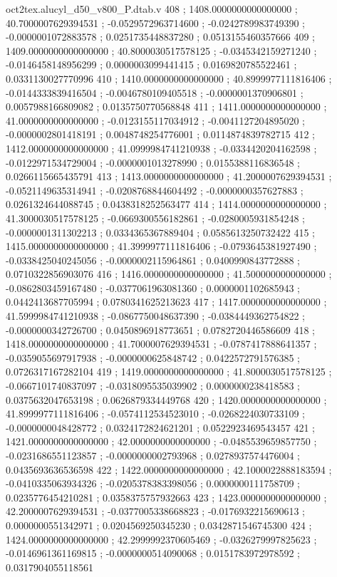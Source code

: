\begin{filecontents}[overwrite]{oct2tex.alucyl_d50_v800_P.dtab.v}
408 ; 1408.0000000000000000 ; 40.7000007629394531 ; -0.0529572963714600 ; -0.0242789983749390 ; -0.0000001072883578 ; 0.0251735448837280 ; 0.0513155460357666
409 ; 1409.0000000000000000 ; 40.8000030517578125 ; -0.0345342159271240 ; -0.0146458148956299 ; 0.0000003099441415 ; 0.0169820785522461 ; 0.0331130027770996
410 ; 1410.0000000000000000 ; 40.8999977111816406 ; -0.0144333839416504 ; -0.0046780109405518 ; -0.0000001370906801 ; 0.0057988166809082 ; 0.0135750770568848
411 ; 1411.0000000000000000 ; 41.0000000000000000 ; -0.0123155117034912 ; -0.0041127204895020 ; -0.0000002801418191 ; 0.0048748254776001 ; 0.0114874839782715
412 ; 1412.0000000000000000 ; 41.0999984741210938 ; -0.0334420204162598 ; -0.0122971534729004 ; -0.0000001013278990 ; 0.0155388116836548 ; 0.0266115665435791
413 ; 1413.0000000000000000 ; 41.2000007629394531 ; -0.0521149635314941 ; -0.0208768844604492 ; -0.0000000357627883 ; 0.0261324644088745 ; 0.0438318252563477
414 ; 1414.0000000000000000 ; 41.3000030517578125 ; -0.0669300556182861 ; -0.0280005931854248 ; -0.0000001311302213 ; 0.0334365367889404 ; 0.0585613250732422
415 ; 1415.0000000000000000 ; 41.3999977111816406 ; -0.0793645381927490 ; -0.0338425040245056 ; -0.0000002115964861 ; 0.0400990843772888 ; 0.0710322856903076
416 ; 1416.0000000000000000 ; 41.5000000000000000 ; -0.0862803459167480 ; -0.0377061963081360 ; 0.0000001102685943 ; 0.0442413687705994 ; 0.0780341625213623
417 ; 1417.0000000000000000 ; 41.5999984741210938 ; -0.0867750048637390 ; -0.0384449362754822 ; -0.0000000342726700 ; 0.0450896918773651 ; 0.0782720446586609
418 ; 1418.0000000000000000 ; 41.7000007629394531 ; -0.0787417888641357 ; -0.0359055697917938 ; -0.0000000625848742 ; 0.0422572791576385 ; 0.0726317167282104
419 ; 1419.0000000000000000 ; 41.8000030517578125 ; -0.0667101740837097 ; -0.0318095535039902 ; 0.0000000238418583 ; 0.0375632047653198 ; 0.0626879334449768
420 ; 1420.0000000000000000 ; 41.8999977111816406 ; -0.0574112534523010 ; -0.0268224030733109 ; -0.0000000048428772 ; 0.0324172824621201 ; 0.0522923469543457
421 ; 1421.0000000000000000 ; 42.0000000000000000 ; -0.0485539659857750 ; -0.0231686551123857 ; -0.0000000002793968 ; 0.0278937574476004 ; 0.0435693636536598
422 ; 1422.0000000000000000 ; 42.1000022888183594 ; -0.0410335063934326 ; -0.0205378383398056 ; 0.0000000111758709 ; 0.0235776454210281 ; 0.0358375757932663
423 ; 1423.0000000000000000 ; 42.2000007629394531 ; -0.0377005338668823 ; -0.0176932215690613 ; 0.0000000551342971 ; 0.0204569250345230 ; 0.0342871546745300
424 ; 1424.0000000000000000 ; 42.2999992370605469 ; -0.0326279997825623 ; -0.0146961361169815 ; -0.0000000514090068 ; 0.0151783972978592 ; 0.0317904055118561

\end{filecontents}

